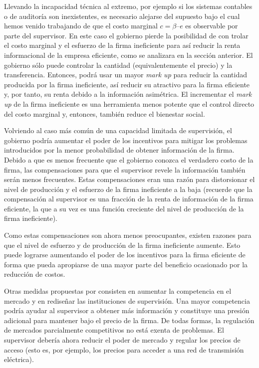\documentclass[
  12pt,
  spanish,
]{book}
\begin{document}
Llevando la incapacidad técnica al extremo, por ejemplo si los sistemas contables o de auditoría son inexistentes, es necesario alejarse del supuesto bajo el cual hemos venido trabajando de que el costo marginal \(c = β – e\) es observable por parte del supervisor. En este caso el gobierno pierde la posibilidad de con trolar el costo marginal y el esfuerzo de la firma ineficiente para así reducir la renta informacional de la empresa eficiente, como se analizara en la sección anterior. El gobierno sólo puede controlar la cantidad (equivalentemente el precio) y la transferencia. Entonces, podrá usar un mayor \emph{mark up} para reducir la cantidad producida por la firma ineficiente, así reducir su atractivo para la firma eficiente y, por tanto, su renta debido a la información asimétrica. El incrementar el \emph{mark up} de la firma ineficiente es una herramienta menos potente que el control directo del costo marginal y, entonces, también reduce el bienestar social.

Volviendo al caso más común de una capacidad limitada de supervisión, el gobierno podría aumentar el poder de los incentivos para mitigar los problemas introducidos por la menor probabilidad de obtener información de la firma. Debido a que es menos frecuente que el gobierno conozca el verdadero costo de la firma, las compensaciones para que el supervisor revele la información también serán menos frecuentes. Estas compensaciones eran una razón para distorsionar el nivel de producción y el esfuerzo de la firma ineficiente a la baja (recuerde que la compensación al supervisor es una fracción de la renta de información de la firma eficiente, la que a su vez es una función creciente del
nivel de producción de la firma ineficiente).

Como estas compensaciones son ahora menos preocupantes, existen razones para que el nivel de esfuerzo y de producción de la firma ineficiente aumente. Esto puede lograrse aumentando el poder de los incentivos para la firma eficiente de forma que pueda apropiarse de una mayor parte del beneficio ocasionado por la reducción de costos.

Otras medidas propuestas por \citet{Laffont2005} consisten en aumentar la competencia en el mercado y en rediseñar las instituciones de supervisión. Una mayor competencia podría ayudar al supervisor a obtener más información y constituye una presión adicional para mantener bajo el precio de la firma. De todas formas, la regulación de mercados parcialmente competitivos no está exenta de problemas. El supervisor debería ahora reducir el poder de mercado y regular los precios de acceso (esto es, por ejemplo, los precios para acceder a una red de transmisión eléctrica).
\end{document}
